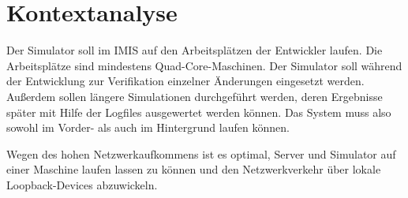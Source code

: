 
\section{Kontextanalyse}\label{sec:context_ana}
Der Simulator soll im IMIS auf den Arbeitsplätzen der Entwickler laufen. Die Arbeitsplätze sind mindestens Quad-Core-Maschinen. Der Simulator soll während der Entwicklung zur Verifikation einzelner Änderungen eingesetzt werden. Außerdem sollen längere Simulationen durchgeführt werden, deren Ergebnisse später mit Hilfe der Logfiles ausgewertet werden können. Das System muss also sowohl im Vorder- als auch im Hintergrund laufen können.

Wegen des hohen Netzwerkaufkommens ist es optimal, Server und Simulator auf einer Maschine laufen lassen zu können und den Netzwerkverkehr über lokale Loopback-Devices abzuwickeln.
